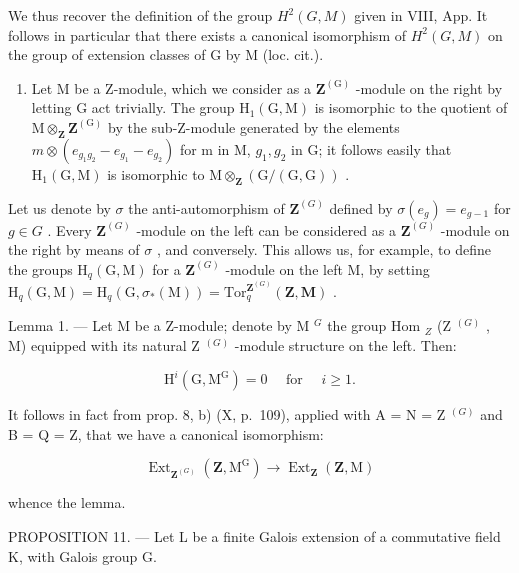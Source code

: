 We thus recover the definition of the group \(H^{2}(G, M)\) given in VIII, App. It follows in particular that there exists a canonical isomorphism of \(H^{2}(G, M)\) on the group of extension classes of G by M (loc. cit.).

\begin{enumerate}
\def\labelenumi{\arabic{enumi})}
\setcounter{enumi}{3}
\tightlist
\item
  Let M be a Z-module, which we consider as a \(\mathbf{Z}^{(\mathrm{G})}\) -module on the right by letting G act trivially. The group \(\mathrm{H}_{1}(\mathrm{G},\mathrm{M})\) is isomorphic to the quotient of \(\mathrm{M}\otimes_{\mathbf{Z}}\mathbf{Z}^{(\mathrm{G})}\) by the sub-Z-module generated by the elements \(m\otimes(e_{g_{1}g_{2}}-e_{g_{1}}-e_{g_{2}})\) for m in M, \(g_{1}, g_{2}\) in G; it follows easily that \(\mathrm{H}_{1}(\mathrm{G},\mathrm{M})\) is isomorphic to \(\mathrm{M}\otimes_{\mathbf{Z}}(\mathrm{G}/(\mathrm{G},\mathrm{G}))\) .
\end{enumerate}

Let us denote by \(\sigma\) the anti-automorphism of \(\mathbf{Z}^{(G)}\) defined by \(\sigma(e_g) = e_{g-1}\) for \(g \in G\) . Every \(\mathbf{Z}^{(G)}\) -module on the left can be considered as a \(\mathbf{Z}^{(G)}\) -module on the right by means of \(\sigma\) , and conversely. This allows us, for example, to define the groups \(\mathrm{H}_q(\mathrm{G}, \mathrm{M})\) for a \(\mathbf{Z}^{(G)}\) -module on the left M, by setting \(\mathrm{H}_q(\mathrm{G}, \mathrm{M}) = \mathrm{H}_q(\mathrm{G}, \sigma_*(\mathrm{M})) = \mathrm{Tor}_q^{\mathbf{Z}^{(G)}}(\mathbf{Z}, \mathbf{M})\) .

Lemma 1. --- Let M be a Z-module; denote by M \(^{G}\) the group Hom \(_{Z}\) (Z \(^{(G)}\) , M) equipped with its natural Z \(^{(G)}\) -module structure on the left. Then:

\[
\mathrm{H} ^ {i} (\mathrm{G}, \mathrm{M} ^ {\mathrm{G}}) = 0 \quad \text { for } \quad i \geqslant 1.
\]

It follows in fact from prop. 8, b) (X, p.~109), applied with A = N = Z \(^{(G)}\) and B = Q = Z, that we have a canonical isomorphism:

\[
\operatorname{Ext} _ {\mathbf {Z} ^ {(G)}} \left(\mathbf {Z}, \mathrm{M} ^ {\mathrm{G}}\right)\rightarrow \operatorname{Ext} _ {\mathbf {Z}} (\mathbf {Z}, \mathrm{M})
\]

whence the lemma.

PROPOSITION 11. --- Let L be a finite Galois extension of a commutative field K, with Galois group G.

